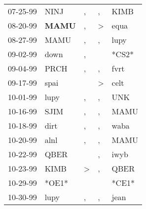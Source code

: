 \begin{supertabular}{p{0.07\textwidth}p{0.06\textwidth}p{0.02\textwidth}p{0.02\textwidth}p{0.06\textwidth}}
          07-25-99\textsuperscript{} &           NINJ\textsuperscript{} &                , &                , &           KIMB\textsuperscript{} \\
          08-20-99\textsuperscript{} &  \textbf{MAMU\textsuperscript{}} &                , &     \textgreater &           equa\textsuperscript{} \\
          08-27-99\textsuperscript{} &           MAMU\textsuperscript{} &                , &                , &           lupy\textsuperscript{} \\
          09-02-99\textsuperscript{} &           down\textsuperscript{} &                , &                  &                            *CS2* \\
          09-04-99\textsuperscript{} &           PRCH\textsuperscript{} &                , &                , &           fvrt\textsuperscript{} \\
          09-17-99\textsuperscript{} &           spai\textsuperscript{} &                  &     \textgreater &           celt\textsuperscript{} \\
          10-01-99\textsuperscript{} &           lupy\textsuperscript{} &                , &                , &            UNK\textsuperscript{} \\
          10-16-99\textsuperscript{} &           SJIM\textsuperscript{} &                , &                , &           MAMU\textsuperscript{} \\
          10-18-99\textsuperscript{} &           dirt\textsuperscript{} &                , &                , &           waba\textsuperscript{} \\
          10-20-99\textsuperscript{} &           alnl\textsuperscript{} &                , &                , &           MAMU\textsuperscript{} \\
          10-22-99\textsuperscript{} &           QBER\textsuperscript{} &                  &                , &           iwyb\textsuperscript{} \\
          10-23-99\textsuperscript{} &           KIMB\textsuperscript{} &     \textgreater &                , &           QBER\textsuperscript{} \\
          10-29-99\textsuperscript{} &                            *OE1* &                  &                  &                            *CE1* \\
          10-30-99\textsuperscript{} &           lupy\textsuperscript{} &                , &                , &           jean\textsuperscript{} \\

\end{supertabular}

